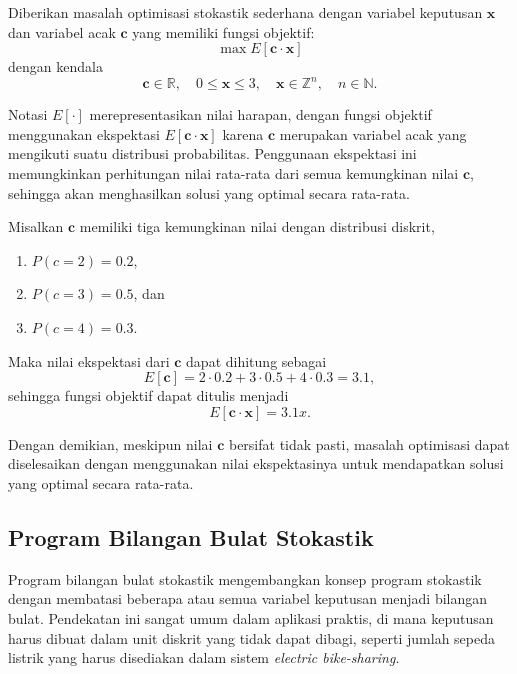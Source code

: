 \begin{contoh}
    Diberikan masalah optimisasi stokastik sederhana dengan variabel keputusan $\boldsymbol{x}$ dan variabel acak $\boldsymbol{c}$ yang memiliki fungsi objektif:
    $$
    \max E[\boldsymbol{c} \cdot \boldsymbol{x}]
    $$
    dengan kendala
    $$
    \boldsymbol{c} \in \mathbb{R}, \quad 0 \leq \boldsymbol{x} \leq 3, \quad \boldsymbol{x} \in \mathbb{Z}^n, \quad n \in \mathbb{N}.
    $$
    
    Notasi $E[\cdot]$ merepresentasikan nilai harapan, dengan fungsi objektif menggunakan ekspektasi $E[\boldsymbol{c} \cdot \boldsymbol{x}]$ karena $\boldsymbol{c}$ merupakan variabel acak yang mengikuti suatu distribusi probabilitas. Penggunaan ekspektasi ini memungkinkan perhitungan nilai rata-rata dari semua kemungkinan nilai $\boldsymbol{c}$, sehingga akan menghasilkan solusi yang optimal secara rata-rata.
    
    Misalkan $\boldsymbol{c}$ memiliki tiga kemungkinan nilai dengan distribusi diskrit,
    \begin{enumerate}
        \item $P(c = 2) = 0.2$,
        \item $P(c = 3) = 0.5$, dan
        \item $P(c = 4) = 0.3$.
    \end{enumerate}   
    Maka nilai ekspektasi dari $\boldsymbol{c}$ dapat dihitung sebagai
    $$E[\boldsymbol{c}] = 2 \cdot 0.2 + 3 \cdot 0.5 + 4 \cdot 0.3 = 3.1,$$
    sehingga fungsi objektif dapat ditulis menjadi
    $$E[\boldsymbol{c} \cdot \boldsymbol{x}] = 3.1x.$$
    
    Dengan demikian, meskipun nilai $\boldsymbol{c}$ bersifat tidak pasti, masalah optimisasi dapat diselesaikan dengan menggunakan nilai ekspektasinya untuk mendapatkan solusi yang optimal secara rata-rata.
\end{contoh}

\subsection{Program Bilangan Bulat Stokastik}
Program bilangan bulat stokastik mengembangkan konsep program stokastik dengan membatasi beberapa atau semua variabel keputusan menjadi bilangan bulat. Pendekatan ini sangat umum dalam aplikasi praktis, di mana keputusan harus dibuat dalam unit diskrit yang tidak dapat dibagi, seperti jumlah sepeda listrik yang harus disediakan dalam sistem \textit{electric bike-sharing}.

